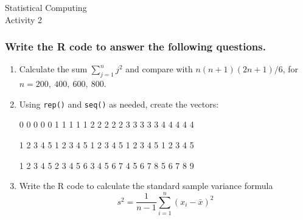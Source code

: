 \documentclass[11pt]{article}
\begin{document}
\begin{center}
{\large    Statistical Computing\\
   Activity 2 }
\end{center}

\subsubsection*{Write the R code to answer the following questions.}


\begin{enumerate}
\item Calculate the sum $\sum_{j=1}^n j^2$ and compare with $n(n+1)(2n+1)/6$, for $n=200,~400,~600,~800$.
\item Using \texttt{rep()} and \texttt{seq()} as needed, create the vectors:
\begin{center}0 0 0 0 0 1 1 1 1 1  2 2 2 2 2 3 3 3 3 3 4 4 4 4 4\end{center}
\begin{center}1 2 3 4 5 1 2 3 4 5 1 2 3 4 5 1 2 3 4 5 1 2 3 4 5\end{center}
\begin{center}1 2 3 4 5 2 3 4 5 6 3 4 5 6 7 4 5 6 7 8 5 6 7 8 9\end{center}
\item Write the R code to calculate the standard sample variance formula
$$s^2 = \frac{1}{n-1} \sum_{i=1}^n(x_i-\bar{x})^2 $$
\end{enumerate}
\end{document}

